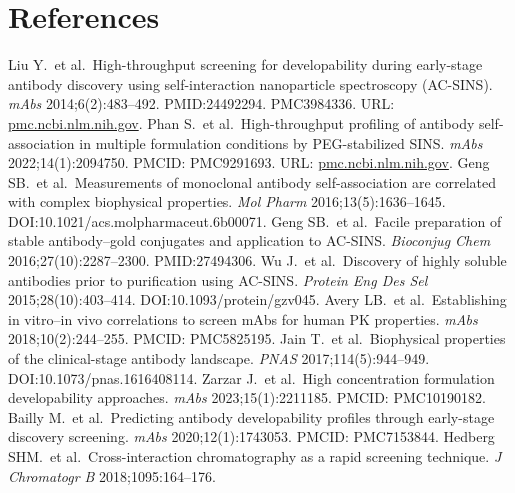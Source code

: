 \section*{References}
\begin{thebibliography}{99}\setlength\itemsep{2pt}
 Liu Y.\ et al.\ High-throughput screening for developability during early-stage antibody discovery using self-interaction nanoparticle spectroscopy (AC-SINS). \emph{mAbs} 2014;6(2):483–492. PMID:24492294. PMC3984336. URL: \href{https://pmc.ncbi.nlm.nih.gov/articles/PMC3984336/}{pmc.ncbi.nlm.nih.gov}. \cite{Liu2013,turn8search0}
 Phan S.\ et al.\ High-throughput profiling of antibody self-association in multiple formulation conditions by PEG-stabilized SINS. \emph{mAbs} 2022;14(1):2094750. PMCID: PMC9291693. URL: \href{https://pmc.ncbi.nlm.nih.gov/articles/PMC9291693/}{pmc.ncbi.nlm.nih.gov}. \cite{Phan2022,turn4view0}
 Geng SB.\ et al.\ Measurements of monoclonal antibody self-association are correlated with complex biophysical properties. \emph{Mol Pharm} 2016;13(5):1636–1645. DOI:10.1021/acs.molpharmaceut.6b00071. \cite{Geng2016_MolPharm,turn1search11}
 Geng SB.\ et al.\ Facile preparation of stable antibody–gold conjugates and application to AC-SINS. \emph{Bioconjug Chem} 2016;27(10):2287–2300. PMID:27494306. \cite{Geng2016_Bioconj,turn9search0}
 Wu J.\ et al.\ Discovery of highly soluble antibodies prior to purification using AC-SINS. \emph{Protein Eng Des Sel} 2015;28(10):403–414. DOI:10.1093/protein/gzv045. \cite{Wu2015,turn1search8}
 Avery LB.\ et al.\ Establishing in vitro–in vivo correlations to screen mAbs for human PK properties. \emph{mAbs} 2018;10(2):244–255. PMCID: PMC5825195. \cite{Avery2018,turn8search8}
 Jain T.\ et al.\ Biophysical properties of the clinical-stage antibody landscape. \emph{PNAS} 2017;114(5):944–949. DOI:10.1073/pnas.1616408114. \cite{Jain2017,turn0search6}
 Zarzar J.\ et al.\ High concentration formulation developability approaches. \emph{mAbs} 2023;15(1):2211185. PMCID: PMC10190182. \cite{Zarzar2023,turn0search7}
 Bailly M.\ et al.\ Predicting antibody developability profiles through early-stage discovery screening. \emph{mAbs} 2020;12(1):1743053. PMCID: PMC7153844. \cite{Bailly2020,turn0search2}
 Hedberg SHM.\ et al.\ Cross-interaction chromatography as a rapid screening technique. \emph{J Chromatogr B} 2018;1095:164–176. \cite{Hedberg2018,turn0search4}

\end{thebibliography}
